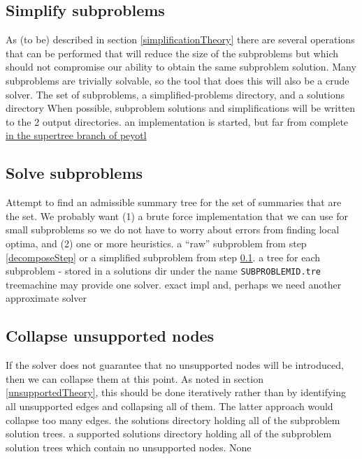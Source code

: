 \documentclass[11pt]{article}
\begin{document}
\subsection{Simplify subproblems}\label{simplifyStep}
\stepExplanation As (to be) described in section \ref{simplificationTheory} there
    are several operations that can be performed that will reduce the size of the
    subproblems but which should not compromise our ability to obtain the same
    subproblem solution.
    Many subproblems are trivially solvable, so the tool that does this
    will also be a crude solver.
\stepInput The set of subproblems, a simplified-problems directory, and a solutions directory
\stepOutput When possible, subproblem solutions and simplifications will be written to the 2 output directories.
\currImpl an implementation is started, but far from complete \href{https://github.com/OpenTreeOfLife/peyotl/blob/supertree/scripts/supertree/simplify_subproblems.py}{in the supertree branch of peyotl}
\implTODO {}
\currURL 
 
\subsection{Solve subproblems}
\stepExplanation Attempt to find an admissible summary tree for the set of 
    summaries that are the \MSWIPSD set.
    We probably want (1) a brute force implementation that we can use for small
    subproblems so we do not have to worry about errors from finding local 
    optima, and (2) one or more heuristics.
\stepInput a ``raw'' subproblem from step \ref{decomposeStep} or a simplified 
    subproblem from step \ref{simplifyStep}.
\stepOutput a tree for each subproblem - stored in a solutions dir under the name
    \texttt{SUBPROBLEMID.tre}
\currImpl treemachine may provide one solver.
\implTODO exact impl and, perhaps we need another approximate solver
\currURL 
 
\subsection{Collapse unsupported nodes}
\stepExplanation If the solver does not guarantee that no unsupported nodes will
    be introduced, then we can collapse them at this point.
    As noted in section \ref{unsupportedTheory}, this should be done
    iteratively rather than by identifying all unsupported edges and 
    collapsing all of them.
    The latter approach would collapse too many edges.
\stepInput the solutions directory holding all of the subproblem solution trees.
\stepOutput a supported solutions directory holding all of the subproblem solution trees
    which contain no unsupported nodes.
\currImpl None
\implTODO {}
\end{document}
